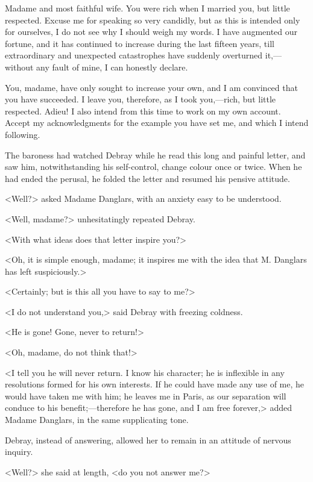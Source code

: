 \begin{mail}{}{Madame and most faithful wife.}
You were rich when I married you, but little respected. Excuse me for speaking so very candidly, but as this is intended only for ourselves, I do not see why I should weigh my words. I have augmented our fortune, and it has continued to increase during the last fifteen years, till extraordinary and unexpected catastrophes have suddenly overturned it,—without any fault of mine, I can honestly declare. 

You, madame, have only sought to increase your own, and I am convinced that you have succeeded. I leave you, therefore, as I took you,—rich, but little respected. Adieu! I also intend from this time to work on my own account. Accept my acknowledgments for the example you have set me, and which I intend following. 

\end{mail}

 The baroness had watched Debray while he read this long and painful letter, and saw him, notwithstanding his self-control, change colour once or twice. When he had ended the perusal, he folded the letter and resumed his pensive attitude. 

 <Well?> asked Madame Danglars, with an anxiety easy to be understood. 

 <Well, madame?> unhesitatingly repeated Debray. 

 <With what ideas does that letter inspire you?> 

 <Oh, it is simple enough, madame; it inspires me with the idea that M. Danglars has left suspiciously.> 

 <Certainly; but is this all you have to say to me?> 

 <I do not understand you,> said Debray with freezing coldness. 

 <He is gone! Gone, never to return!> 

 <Oh, madame, do not think that!> 

 <I tell you he will never return. I know his character; he is inflexible in any resolutions formed for his own interests. If he could have made any use of me, he would have taken me with him; he leaves me in Paris, as our separation will conduce to his benefit;—therefore he has gone, and I am free forever,> added Madame Danglars, in the same supplicating tone. 

 Debray, instead of answering, allowed her to remain in an attitude of nervous inquiry. 

 <Well?> she said at length, <do you not answer me?> 

